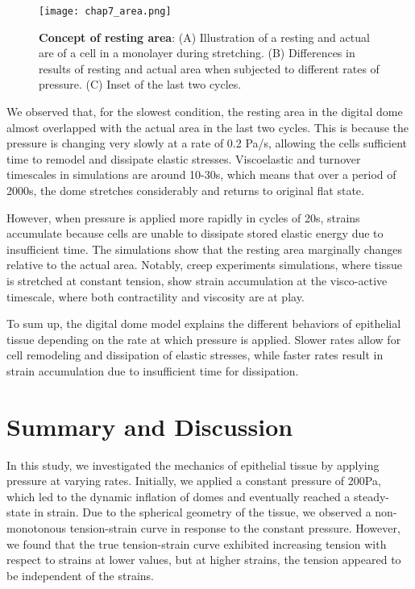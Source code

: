 \begin{figure}
	\centering
	\texttt{[image: chap7\_area.png]}
	\caption{\label{fig_7_7} \textbf{Concept of resting area}: (A) Illustration of a resting and actual are of a cell in a monolayer during stretching. (B) Differences in results of resting and actual area when subjected to different rates of pressure. (C) Inset of the last two cycles.
	}
\end{figure}

We observed that, for the slowest condition, the resting area in the
digital dome almost overlapped with the actual area in the last two
cycles. This is because the pressure is changing very slowly at a rate
of 0.2 Pa/s, allowing the cells sufficient time to remodel and dissipate
elastic stresses. Viscoelastic and turnover timescales in simulations
are around 10-30s, which means that over a period of 2000s, the dome
stretches considerably and returns to original flat state.

However, when pressure is applied more rapidly in cycles of 20s, strains
accumulate because cells are unable to dissipate stored elastic energy
due to insufficient time. The simulations show that the resting area
marginally changes relative to the actual area. Notably, creep
experiments simulations, where tissue is stretched at constant tension,
show strain accumulation at the visco-active timescale, where both
contractility and viscosity are at play.

To sum up, the digital dome model explains the different behaviors of
epithelial tissue depending on the rate at which pressure is applied.
Slower rates allow for cell remodeling and dissipation of elastic
stresses, while faster rates result in strain accumulation due to
insufficient time for dissipation.

\hypertarget{summary}{%
	\section{Summary and Discussion}\label{summary}}

In this study, we investigated the mechanics of epithelial tissue by
applying pressure at varying rates. Initially, we applied a constant
pressure of 200Pa, which led to the dynamic inflation of domes and
eventually reached a steady-state in strain. Due to the spherical
geometry of the tissue, we observed a non-monotonous tension-strain
curve in response to the constant pressure. However, we found that the
true tension-strain curve exhibited increasing tension with respect to
strains at lower values, but at higher strains, the tension appeared to
be independent of the strains.

